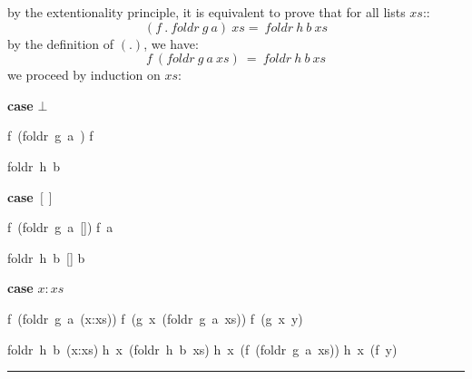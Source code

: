 \documentclass[twoside]{article}
\newenvironment{proof}{{\bf Proof:}}{\hfill\rule{2mm}{2mm}}
\begin{document}
\begin{proof}
by the extentionality principle, it is equivalent to prove that for all lists
$xs$::
$$(f~.~foldr~g~a)~xs=~foldr~h~b~xs$$
by the definition of $(.)$, we have:
$$f~(foldr~g~a~xs)~=~foldr~h~b~xs$$
we proceed by induction on $xs$:

\textbf{case} $\bot$

\begin{minipage}[t]{.4\textwidth}
\begin{calculation}
  f~(foldr~g~a~\bot)
  f~\bot
{}
  \bot
\end{calculation}
\end{minipage}%
\begin{minipage}[t]{.4\textwidth}
\begin{calculation}
  foldr~h~b~\bot
{}
  \bot
\end{calculation}
\end{minipage}

\textbf{case} $[]$

\begin{minipage}[t]{.4\textwidth}
\begin{calculation}
  f~(foldr~g~a~[])
  f~a
\end{calculation}
\end{minipage}%
\begin{minipage}[t]{.4\textwidth}
\begin{calculation}
  foldr~h~b~[]
  b
\end{calculation}
\end{minipage}

\textbf{case} $x:xs$

\begin{minipage}[t]{.4\textwidth}
\begin{calculation}
  f~(foldr~g~a~(x:xs))
  f~(g~x~(foldr~g~a~xs))
  f~(g~x~y)
\end{calculation}
\end{minipage}%
\begin{minipage}[t]{.4\textwidth}
\begin{calculation}
  foldr~h~b~(x:xs)
  h~x~(foldr~h~b~xs)
  h~x~(f~(foldr~g~a~xs))
  h~x~(f~y)
\end{calculation}
\end{minipage}
\end{proof}
\end{document}
